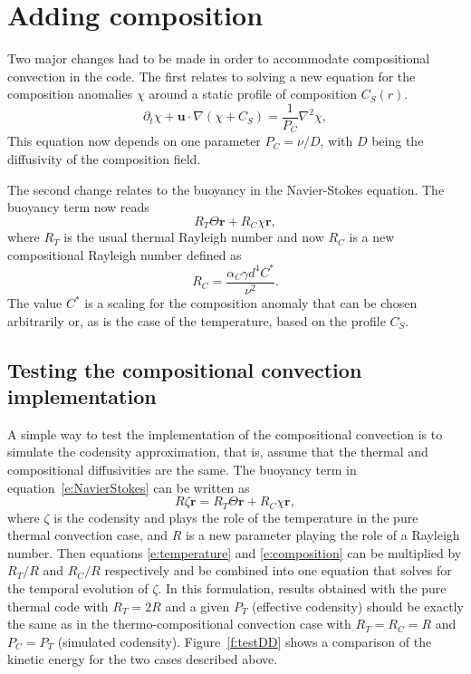 \documentclass[a4paper,10pt]{book}
\renewcommand{\vec}[1]{\mathbf{#1}}
\begin{document}
\section{Adding composition}
Two major changes had to be made in order to accommodate compositional
convection in the code. The first relates to solving a new equation for the
composition anomalies $\chi$ around a static profile of composition $C_S(r)$.
\begin{equation}
\partial_t \chi  + \vec u \cdot \nabla (\chi+C_S) = \frac{1}{P_C} \nabla^2 \chi,
\label{e:composition}
\end{equation}
This equation now depends on one parameter $P_C=\nu/D$, with $D$
being the diffusivity of the composition field.

The second change relates to the buoyancy in the Navier-Stokes equation. The
buoyancy term now reads
\begin{equation}
  R_T \Theta \vec r + R_C \chi \vec r,
\end{equation}
where $R_T$ is the usual thermal Rayleigh number and now $R_C$ is a new
compositional Rayleigh number defined as
\begin{equation}
 R_C = \frac{\alpha_C \gamma d^4 C^*}{\nu^2}.
\end{equation}
The value $C^*$ is a scaling for the composition anomaly that can be
chosen arbitrarily or, as is the case of the temperature, based on the profile
$C_S$.

\subsection{Testing the compositional convection implementation}
A simple way to test the implementation of the compositional convection is to
simulate the codensity approximation, that is, assume that the thermal and
compositional diffusivities are the same. The buoyancy term in
equation~\ref{e:NavierStokes} can be written as
\begin{equation}
R \zeta \vec r = R_T \Theta \vec r + R_C \chi \vec r,
\end{equation}
where $\zeta$ is the codensity and plays the role of the temperature in the
pure thermal convection case, and $R$ is a new parameter playing the role of
a Rayleigh number. Then equations \ref{e:temperature} and
\ref{e:composition} can be multiplied by $R_T/R$ and $R_C/R$ respectively and be
combined into one equation that solves for the temporal evolution of $\zeta$. In
this formulation, results obtained with the pure thermal code with $R_T=2R$ and
a given $P_T$ (effective codensity) should be exactly the same as in the
thermo-compositional convection case with $R_T=R_C=R$ and $P_C=P_T$ (simulated
codensity). Figure~\ref{f:testDD} shows a comparison of the kinetic energy for
the two cases described above.
\end{document}

